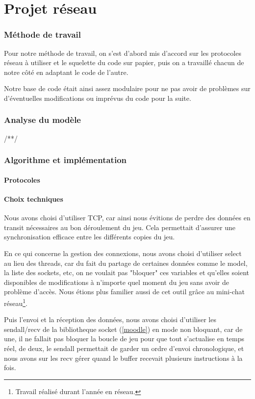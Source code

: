 \documentclass[a4paper]{article}
\begin{document}
\newpage
\part{Projet réseau}

	\section{Méthode de travail}

	Pour notre méthode de travail, on s'est d'abord mis d'accord sur les protocoles réseau à utiliser et le squelette du code sur papier, puis on a travaillé chacun de notre côté en adaptant le code de l'autre.

	Notre base de code était ainsi assez modulaire pour ne pas avoir de problèmes sur d'éventuelles modifications ou imprévus du code pour la suite.

	\section{Analyse du modèle}

	/**/

	\section{Algorithme et implémentation}
		\subsection{Protocoles}
		

		\subsection{Choix techniques}
		Nous avons choisi d'utiliser TCP, car ainsi nous évitions de perdre des données en transit nécessaires au bon déroulement du jeu. Cela permettait d'assurer une synchronisation efficace entre les différents copies du jeu.
		
		En ce qui concerne la gestion des connexions, nous avons choisi d'utiliser select au lieu des threads, car du fait du partage de certaines données comme le model, la liste des sockets, etc, on ne voulait pas "bloquer" ces variables et qu'elles soient disponibles de modifications à n'importe quel moment du jeu sans avoir de problème d'accès. Nous étions plus familier aussi de cet outil grâce au mini-chat réseau\footnote{Travail réalisé durant l'année en réseau.}.
		
		Puis l'envoi et la réception des données, nous avons choisi d'utiliser les sendall/recv de la bibliotheque socket (\ref{moodle}) en mode non bloquant, car de une, il ne fallait pas bloquer la boucle de jeu pour que tout s'actualise en temps réel, de deux, le sendall permettait de garder un ordre d'envoi chronologique, et nous avons sur les recv gérer quand le buffer recevait plusieurs instructions à la fois. 
		
\end{document}
